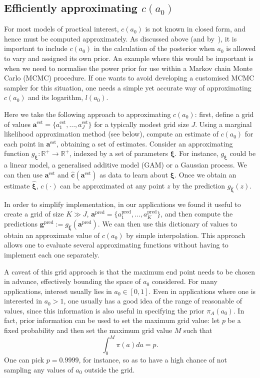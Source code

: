 \documentclass[a4paper, notitlepage, 11pt]{article}
\begin{document}
\subsection{Efficiently approximating $c(a_0)$}
\label{sec:efficient_computation_ca0}

For most models of practical interest, $c(a_0)$ is not known in closed form, and hence must be computed approximately.
As discussed above (and by~\cite{Neuenschwander2009}), it is important to include $c(a_0)$ in the calculation of the posterior when $a_0$ is allowed to vary and assigned its own prior.
An example where this would be important is when we need to normalise the power prior for use within a Markov chain Monte Carlo (MCMC) procedure.
If one wants to avoid developing a customised MCMC sampler for this situation, one needs a simple yet accurate way of approximating $c(a_0)$ and its logarithm, $l(a_0)$.

Here we take the following approach to approximating $c(a_0)$: first, define a grid of values $\boldsymbol a^{\text{est}} = \{ a^{\text{est}}_1, \ldots, a^{\text{est}}_J \}$ for a typically modest grid size $J$.
Using a marginal likelihood approximation method (see below), compute an estimate of $c(a_0)$ for each point in $\boldsymbol a^{\text{est}}$, obtaining a set of estimates.
Consider an approximating function $g_{\boldsymbol\xi} : \mathbb{R}^+ \to \mathbb{R}^+$, indexed by a set of parameters $\boldsymbol\xi$.
For instance, $g_{\boldsymbol\xi}$ could be a linear model, a generalised additive model (GAM) or a Gaussian process.
We can then use  $\boldsymbol a^{\text{est}}$ and $\hat{\boldsymbol c}(\boldsymbol a^{\text{est}})$ as data to learn about $\boldsymbol\xi$.
Once we obtain an estimate  $\hat{\boldsymbol \xi}$, $c(\cdot)$ can be approximated at any point $z$ by the prediction $g_{\hat{\boldsymbol \xi}}(z)$.

In order to simplify implementation, in our applications we found it useful to create a grid of size $K \gg J$, $\boldsymbol a^{\text{pred}} = \{ a^{\text{pred}}_1, \ldots, a^{\text{pred}}_K \}$, and then compute the predictions $\boldsymbol g^{\text{pred}} := g_{\hat{\boldsymbol \xi}}( \boldsymbol a^{\text{pred}} )$.
We can then use this dictionary of values to obtain an approximate value of $c(a_0)$ by simple interpolation.
This approach allows one to evaluate several approximating functions without having to implement each one separately.

A caveat of this grid approach is that the maximum end point needs to be chosen in advance, effectively bounding the space of $a_0$ considered. 
For many applications, interest usually lies in $a_0 \in [0, 1]$.
Even in applications where one is interested in $a_0 > 1$, one usually has a good idea of the range of reasonable of values, since this information is also useful in specifying the prior $\pi_A(a_0)$.
In fact, prior information can be used to set the maximum grid value: let $p$ be a fixed probability and then set the maximum grid value $M$ such that
\[ \int_0^M \pi(a) da = p. \]
One can pick $p = 0.9999$, for instance, so as to have a high chance of not sampling any values of $a_0$ outside the grid.
\end{document}
